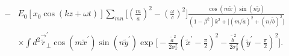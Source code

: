\documentclass[11pt,oneside]{article}
\begin{document}
\begin{equation}
\begin{split}
- & E_{0}
    \left[ x_{0} \cos( k z+\omega t) \right]
    \sum_{mn} 
    \Bigg[ \left( \frac{m}{\tilde{a}} \right)^{2}
         - \left( \frac{\omega}{c} \right)^{2} \Bigg]
    \frac{ \cos \left( m \tilde{x} \right) \sin \left( n \tilde{y} \right) }
         { \left( 1 - \beta^{2} \right) k^{2}
         + \Big[
           \left( m / \tilde{a} \right)^{2} + 
           \left( n / \tilde{b} \right)^{2}  
           \Big] }  \\
  & \times
    \int d^{2} \vec{\tilde{r}}_{\perp}^{\prime}
    \cos \left( m \tilde{x}^{\prime} \right)
    \sin \left( n \tilde{y}^{\prime} \right)
    \exp \Bigg[
       - \frac{ \tilde{a}^{2} } { 2\sigma_{x}^{2}}
         \left( \tilde{x}^{\prime} - \frac{\pi}{2} \right)^{2}
       - \frac{ \tilde{b}^{2} } { 2\sigma_{y}^{2}}
         \left( \tilde{y}^{\prime} - \frac{\pi}{2} \right)^{2}
         \Bigg] . \\
\end{split}
\end{equation}
\end{document}
